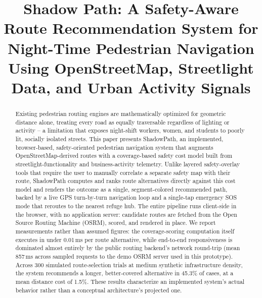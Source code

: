 \documentclass[conference]{IEEEtran}
\begin{document}
\title{Shadow Path: A Safety-Aware Route Recommendation System for Night-Time Pedestrian Navigation Using OpenStreetMap, Streetlight Data, and Urban Activity Signals\\}

\author{
\and
{}
}

\maketitle

\begin{abstract}
Existing pedestrian routing engines are mathematically optimized for geometric distance alone, treating every road as equally traversable regardless of lighting or activity -- a limitation that exposes night-shift workers, women, and students to poorly lit, socially isolated streets. This paper presents ShadowPath, an implemented, browser-based, safety-oriented pedestrian navigation system that augments OpenStreetMap-derived routes with a coverage-based safety cost model built from streetlight-functionality and business-activity telemetry. Unlike layered safety-overlay tools that require the user to manually correlate a separate safety map with their route, ShadowPath computes and ranks route alternatives directly against this cost model and renders the outcome as a single, segment-colored recommended path, backed by a live GPS turn-by-turn navigation loop and a single-tap emergency SOS mode that reroutes to the nearest refuge hub. The entire pipeline runs client-side in the browser, with no application server: candidate routes are fetched from the Open Source Routing Machine (OSRM), scored, and rendered in place. We report measurements rather than assumed figures: the coverage-scoring computation itself executes in under 0.01\,ms per route alternative, while end-to-end responsiveness is dominated almost entirely by the public routing backend's network round-trip (mean 857\,ms across sampled requests to the demo OSRM server used in this prototype). Across 300 simulated route-selection trials at medium synthetic infrastructure density, the system recommends a longer, better-covered alternative in 45.3\% of cases, at a mean distance cost of 1.5\%. These results characterize an implemented system's actual behavior rather than a conceptual architecture's projected one.
\end{abstract}
\end{document}
